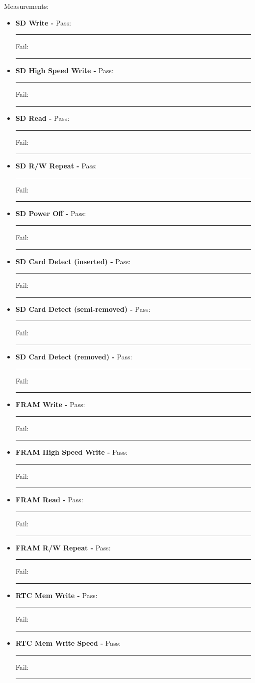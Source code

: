 {\Large Measurements: }\\
\begin{itemize}
\item \textbf{SD Write - } \hfill Pass: \rule{1cm}{0.15mm} \hspace{1cm} Fail: \rule{1cm}{0.15mm}
\item \textbf{SD High Speed Write - } \hfill Pass: \rule{1cm}{0.15mm} \hspace{1cm} Fail: \rule{1cm}{0.15mm}
\item \textbf{SD Read - } \hfill Pass: \rule{1cm}{0.15mm} \hspace{1cm} Fail: \rule{1cm}{0.15mm}
\item \textbf{SD R/W Repeat - } \hfill Pass: \rule{1cm}{0.15mm} \hspace{1cm} Fail: \rule{1cm}{0.15mm}
\item \textbf{SD Power Off - } \hfill Pass: \rule{1cm}{0.15mm} \hspace{1cm} Fail: \rule{1cm}{0.15mm}
\item \textbf{SD Card Detect (inserted) - } \hfill Pass: \rule{1cm}{0.15mm} \hspace{1cm} Fail: \rule{1cm}{0.15mm}
\item \textbf{SD Card Detect (semi-removed) - } \hfill Pass: \rule{1cm}{0.15mm} \hspace{1cm} Fail: \rule{1cm}{0.15mm}
\item \textbf{SD Card Detect (removed) - } \hfill Pass: \rule{1cm}{0.15mm} \hspace{1cm} Fail: \rule{1cm}{0.15mm}
\item \textbf{FRAM Write - } \hfill Pass: \rule{1cm}{0.15mm} \hspace{1cm} Fail: \rule{1cm}{0.15mm}
\item \textbf{FRAM High Speed Write - } \hfill Pass: \rule{1cm}{0.15mm} \hspace{1cm} Fail: \rule{1cm}{0.15mm}
\item \textbf{FRAM Read - } \hfill Pass: \rule{1cm}{0.15mm} \hspace{1cm} Fail: \rule{1cm}{0.15mm}
\item \textbf{FRAM R/W Repeat - } \hfill Pass: \rule{1cm}{0.15mm} \hspace{1cm} Fail: \rule{1cm}{0.15mm}
\item \textbf{RTC Mem Write - } \hfill Pass: \rule{1cm}{0.15mm} \hspace{1cm} Fail: \rule{1cm}{0.15mm}
\item \textbf{RTC Mem Write Speed - } \hfill Pass: \rule{1cm}{0.15mm} \hspace{1cm} Fail: \rule{1cm}{0.15mm}

\end{itemize}
